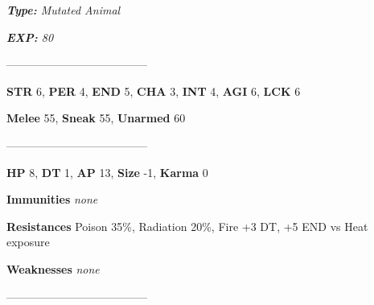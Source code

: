 \documentclass[11pt,a4paper,twocolumn]{book}
\begin{document}
	\emph{\textbf{Type:} Mutated Animal}
	
	\emph{\textbf{EXP:} 80}
	
%		
%	
%		

	--------------------------------------

	\noindent
	\textbf{STR} 6, \textbf{PER} 4, \textbf{END} 5, \textbf{CHA} 3, \textbf{INT} 4, \textbf{AGI} 6, \textbf{LCK} 6
	
	\noindent
	\textbf{Melee} 55, \textbf{Sneak} 55, \textbf{Unarmed} 60
	
	--------------------------------------
	
	\noindent
	\textbf{HP} 8, \textbf{DT} 1, \textbf{AP} 13, \textbf{Size} -1, \textbf{Karma} 0
	
	
	\noindent
	\textbf{Immunities} \emph{none} %
	
	\noindent
	\textbf{Resistances} Poison 35\%, Radiation 20\%, Fire +3 DT, +5 END vs Heat exposure %
	
	\noindent
	\textbf{Weaknesses} \emph{none} %
	
	--------------------------------------
	
\end{document}
